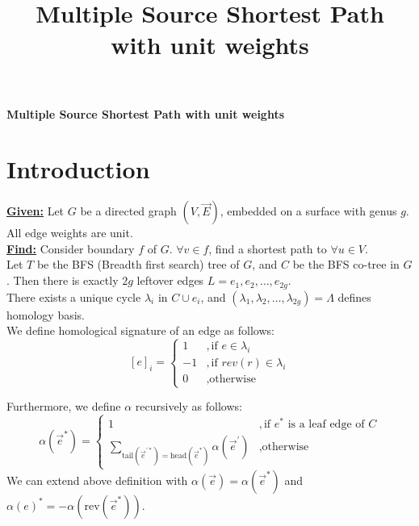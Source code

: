 \documentclass{article}
\begin{document}
\title{Multiple Source Shortest Path with unit weights}

\begin{center}
\textbf{\large Multiple Source Shortest Path with unit weights}
\end{center}

\section{Introduction}

\textbf{\underline{Given:}} Let $G$ be a directed graph $(V, \vec{E})$, embedded
on a surface with genus $g$. All edge weights are unit. \\
\textbf{\underline{Find:}} Consider boundary $f$ of $G$. $\forall v \in f$, find
a shortest path to $\forall u \in V$. \\

Let $T$ be the BFS (Breadth first search) tree of $G$, and $C$ be the BFS co-tree
in $G$. Then there is exactly $2g$ leftover edges $L = {e_1, e_2, \ldots, e_{2g}}$. \\

There exists a unique cycle $\lambda_i$ in $C \cup {e_i}$, and $(\lambda_1, 
\lambda_2, \ldots, \lambda_{2g}) = \Lambda$ defines homology basis. \\
We define homological signature of an edge as follows:
\[ [e]_{i} = \begin{cases} 1 & ,\mbox{if } e \in \lambda_i \\
                          -1 & ,\mbox{if } rev(r) \in \lambda_i \\
                           0 & ,\mbox{otherwise} \end{cases}\]

Furthermore, we define $\alpha$ recursively as follows: \\
\[ \alpha(\vec{e}^*) = \begin{cases} 1 & ,\mbox{if } e^* \mbox{ is a leaf edge of } C \\
                           \sum \limits_{ \text{tail}(\vec{e}^{'*})
                           = \text{head}(\vec{e}^*) } \alpha(\vec{e}^{'}) & ,
                           \mbox{otherwise} \end{cases}\]
We can extend above definition with $\alpha(\vec{e}) = \alpha( \vec{e}^* )$ and 
  $\alpha(e)^* = - \alpha(\text{rev}(\vec{e}^*))$. \\
\end{document}
